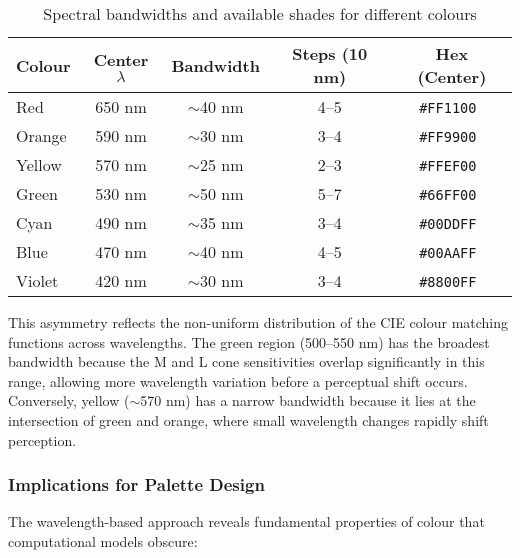 \documentclass[12pt,a4paper]{article}
\newcommand{\wavelength}{\lambda}
\newcommand{\hexcolour}[1]{%
  \definecolor{tempcolour}{HTML}{#1}%
  \texttt{\##1}~\raisebox{0.2ex}{\fboxsep=0pt\fbox{\colorbox{tempcolour}{\phantom{XX}}}}%
}
\begin{document}
\begin{table}[ht]
\centering
\caption{Spectral bandwidths and available shades for different colours}
\label{tab:spectral-bandwidths}
\begin{tabular}{lcccc}
\toprule
\textbf{Colour} & \textbf{Center $\wavelength$} & \textbf{Bandwidth} & \textbf{Steps (10 nm)} & \textbf{Hex (Center)} \\
\midrule
Red & 650 nm & $\sim$40 nm & 4--5 & \hexcolour{FF1100} \\
Orange & 590 nm & $\sim$30 nm & 3--4 & \hexcolour{FF9900} \\
Yellow & 570 nm & $\sim$25 nm & 2--3 & \hexcolour{FFEF00} \\
Green & 530 nm & $\sim$50 nm & 5--7 & \hexcolour{66FF00} \\
Cyan & 490 nm & $\sim$35 nm & 3--4 & \hexcolour{00DDFF} \\
Blue & 470 nm & $\sim$40 nm & 4--5 & \hexcolour{00AAFF} \\
Violet & 420 nm & $\sim$30 nm & 3--4 & \hexcolour{8800FF} \\
\bottomrule
\end{tabular}
\end{table}

This asymmetry reflects the non-uniform distribution of the CIE colour matching functions across wavelengths. The green region (500--550 nm) has the broadest bandwidth because the M and L cone sensitivities overlap significantly in this range, allowing more wavelength variation before a perceptual shift occurs. Conversely, yellow ($\sim$570 nm) has a narrow bandwidth because it lies at the intersection of green and orange, where small wavelength changes rapidly shift perception.

\subsubsection{Implications for Palette Design}

The wavelength-based approach reveals fundamental properties of colour that computational models obscure:
\end{document}
